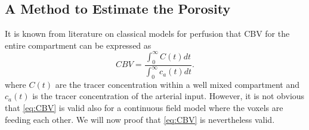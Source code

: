 \documentclass[paper=a4, fontsize=11pt,parskip=half,headings=small]{scrartcl}
\begin{document}
	\subsection{A Method to Estimate the Porosity}\label{sec:CBV}
	
	It is known from literature on classical models for perfusion that CBV for the entire compartment can be expressed as
	\begin{equation}
		CBV = \frac{\int_0^\infty C(t) dt}{\int_0^\infty c_a(t) dt}.
		\label{eq:CBV}
	\end{equation}
	where $C(t)$ are the tracer concentration within a well mixed compartment and $c_a(t)$ is the tracer concentration of the arterial input.
	However, it is not obvious that \eqref{eq:CBV} is valid also for a continuous field model where the voxels are feeding each other. We will now proof that \eqref{eq:CBV} is nevertheless valid.
	
\end{document}
